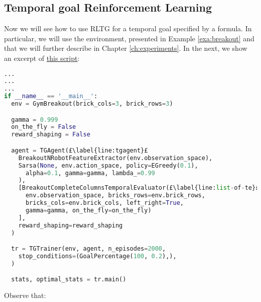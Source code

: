 \subsection{Temporal goal Reinforcement Learning}
Now we will see how to use RLTG for a temporal goal specified by a \LLf formula. In particular, we will use the \Breakout environment, presented in Example \ref{exa:breakout} and that we will further describe in Chapter \ref{ch:experiments}. In the next, we show an excerpt of \href{https://github.com/MarcoFavorito/rltg/blob/master/examples/pygames/breakout.py}{this script}:

\begin{lstlisting}[style = Python, language = Python, escapechar = £, label={ex:rltg-temporal-goal-rl-example}, caption={Temporal Goal Reinforcement Learning using RLTG}]
...
...
...
if __name__ == '__main__':
  env = GymBreakout(brick_cols=3, brick_rows=3)

  gamma = 0.999
  on_the_fly = False
  reward_shaping = False

  agent = TGAgent(£\label{line:tgagent}£
    BreakoutNRobotFeatureExtractor(env.observation_space),
    Sarsa(None, env.action_space, policy=EGreedy(0.1),
      alpha=0.1, gamma=gamma, lambda_=0.99
    ),
    [BreakoutCompleteColumnsTemporalEvaluator(£\label{line:list-of-te}£
      env.observation_space, bricks_rows=env.brick_rows, 
      bricks_cols=env.brick_cols, left_right=True, 
      gamma=gamma, on_the_fly=on_the_fly)
    ],
    reward_shaping=reward_shaping
  )

  tr = TGTrainer(env, agent, n_episodes=2000,
    stop_conditions=(GoalPercentage(100, 0.2),),
  )

  stats, optimal_stats = tr.main()
\end{lstlisting}
Observe that:
